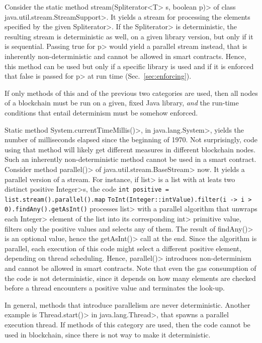 Consider the static method
\<stream(Spliterator$\text{<}$T$\text{>}$ s, boolean p)>
of class \<java.util.stream.StreamSupport>. It
yields a stream for processing the elements specified by
the given \<Spliterator>. If the \<Spliterator> is deterministic,
the resulting stream is deterministic as well,
on a given library version, but only if it is sequential.
Passing true for \<p> would yield a parallel stream instead, that is
inherently non-deterministic and cannot be allowed in smart contracts.
Hence, this method can be used but only if a specific library is used and
if it is enforced that false is passed for \<p> at run time (Sec.~\ref{sec:enforcing}).

If only methods of this and of the previous two categories are used, then
all nodes of a blockchain must be run on a given, fixed Java library, \emph{and}
the run-time conditions that entail determinism must be somehow enforced.

Static method \<System.currentTimeMillis()>, in \<java.lang.System>,
yields the number of milliseconds elapsed since the beginning of 1970.
Not surprisingly, code using that method will likely get different measures in different
blockchain nodes.
Such an inherently non-deterministic method cannot be used in a smart contract.
Consider method \<parallel()> of \<java.util.stream.BaseStream> now.
It yields a parallel version of a stream. For instance, if \<list> is a list with
at leats two distinct positive \<Integer>s, the code
%
\verb!int positive = list.stream().parallel().map!
\verb!ToInt(Integer::intValue).filter(i -> i > 0).findAny().getAsInt()!
%
processes \<list> with a parallel algorithm
that unwraps each \<Integer> element of the list into its corresponding \<int> primitive value,
filters only the positive values and selects any of them.
The result of \<findAny()> is an optional value, hence the
\<getAsInt()> call at the end. Since the algorithm is
parallel, each execution of this code might select a different
positive element, depending on thread scheduling. Hence, \<parallel()>
introduces non-determinism and
cannot be allowed in smart contracts. Note that even the gas consumption
of the code is not deterministic, since it depends on how many elements
are checked before a thread encounters a positive value and terminates
the look-up.

In general, methods that introduce parallelism are never deterministic.
Another example is \<Thread.start()> in \<java.lang.Thread>, that spawns
a parallel execution thread.
If methods of this category are used, then the code cannot be used in blockchain,
since there is not way to make it deterministic.
